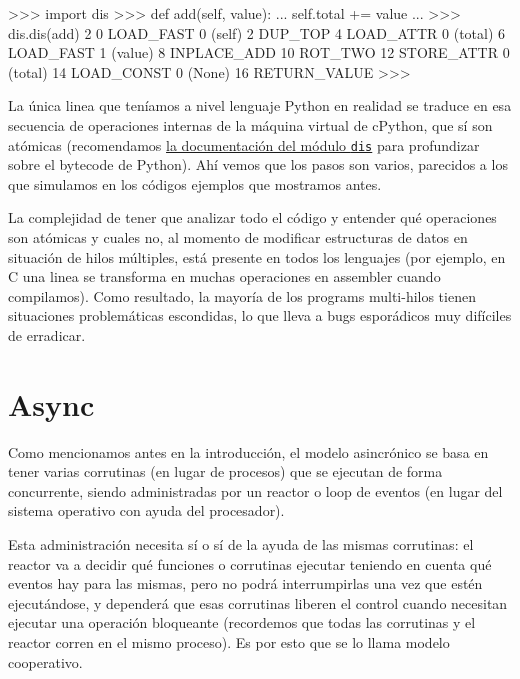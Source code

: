 \begin{py}
>>> import dis
>>> def add(self, value):
...   self.total += value
...
>>> dis.dis(add)
  2           0 LOAD_FAST                0 (self)
              2 DUP_TOP
              4 LOAD_ATTR                0 (total)
              6 LOAD_FAST                1 (value)
              8 INPLACE_ADD
             10 ROT_TWO
             12 STORE_ATTR               0 (total)
             14 LOAD_CONST               0 (None)
             16 RETURN_VALUE
>>>
\end{py}

La única linea que teníamos a nivel lenguaje Python en realidad se traduce en esa secuencia de operaciones internas de la máquina virtual de cPython, que sí son atómicas (recomendamos \href{https://docs.python.org/es/dev/library/dis.html}{la documentación del módulo \texttt{dis}} para profundizar sobre el bytecode de Python). Ahí vemos que los pasos son varios, parecidos a los que simulamos en los códigos ejemplos que mostramos antes.

La complejidad de tener que analizar todo el código y entender qué operaciones son atómicas y cuales no, al momento de modificar estructuras de datos en situación de hilos múltiples, está presente en todos los lenguajes (por ejemplo, en C una linea se transforma en muchas operaciones en assembler cuando compilamos). Como resultado, la mayoría de los programs multi-hilos tienen situaciones problemáticas escondidas, lo que lleva a bugs esporádicos muy difíciles de erradicar.


\section{Async}\label{sec:async}

Como mencionamos antes en la introducción, el modelo asincrónico se basa en tener varias corrutinas (en lugar de procesos) que se ejecutan de forma concurrente, siendo administradas por un reactor o loop de eventos (en lugar del sistema operativo con ayuda del procesador).

Esta administración necesita sí o sí de la ayuda de las mismas corrutinas: el reactor va a decidir qué funciones o corrutinas ejecutar teniendo en cuenta qué eventos hay para las mismas, pero no podrá interrumpirlas una vez que estén ejecutándose, y dependerá que esas corrutinas liberen el control cuando necesitan ejecutar una operación bloqueante (recordemos que todas las corrutinas y el reactor corren en el mismo proceso). Es por esto que se lo llama modelo cooperativo.

